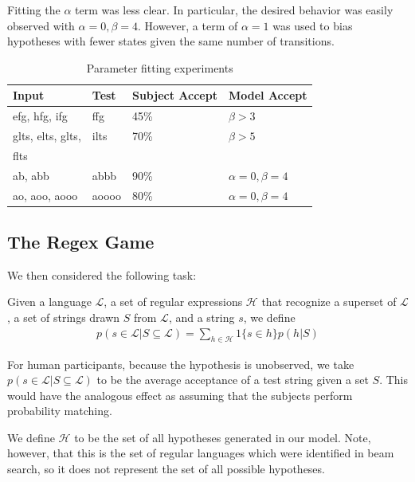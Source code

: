 \documentclass[10pt,letterpaper]{article}
\begin{document}
Fitting the $\alpha$ term was less clear. In particular, the desired behavior was easily observed with $\alpha=0,\beta=4$. However, a term of $\alpha=1$ was used to bias hypotheses with fewer states given the same number of transitions.

\begin{table}['ht]
\begin{center} 
\caption{Parameter fitting experiments} 
\label{parameter-table} 
\vskip 0.12in
\begin{tabular}{llll} 
\hline
Input  & Test & Subject Accept & Model Accept
\\ \hline
efg, hfg, ifg & ffg & 45\% & $\beta > 3$
\\ \hline
glts, elts, glts, & ilts & 70\% & $\beta > 5$
\\ flts
\\ \hline
ab, abb & abbb & 90\% & $\alpha = 0, \beta = 4$
\\ \hline
ao, aoo, aooo & aoooo & 80\% & $\alpha = 0, \beta=4$
\\ \hline
\end{tabular} 
\end{center} 
\end{table}

\subsection{The Regex Game}
We then considered the following task: 

Given a language $\mathcal{L}$, a set of regular expressions $\mathcal{H}$ that recognize a superset of $\mathcal{L}$, a set of strings drawn $S$ from $\mathcal{L}$, and a string $s$, we define
\begin{align*}
	p(s \in \mathcal{L} | S \subseteq {\mathcal{L}}) = \sum_{h \in \mathcal{H}} 1 \{s \in h\} p(h|S)
\end{align*}

For human participants, because the hypothesis is unobserved, we take $p(s \in \mathcal{L} | S \subseteq {\mathcal{L}}) $ to be the average acceptance of a test string given a set $S$. This would have the analogous effect as assuming that the subjects perform probability matching.

We define $\mathcal{H}$ to be the set of all hypotheses generated in our model. Note, however, that this is the set of regular languages which were identified in beam search, so it does not represent the set of all possible hypotheses.
\end{document}

